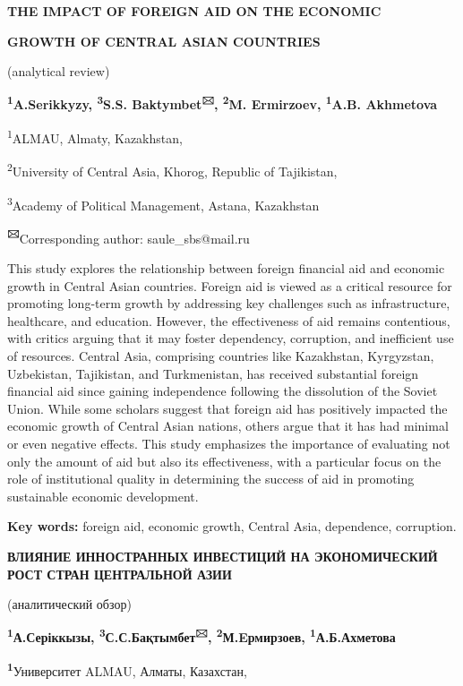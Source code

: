 {\bfseries THE IMPACT OF FOREIGN AID ON THE ECONOMIC}

{\bfseries GROWTH OF CENTRAL ASIAN COUNTRIES}

(analytical review)

{\bfseries \textsuperscript{1}A.Serikkyzy, \textsuperscript{3}S.S.
Baktymbet\textsuperscript{🖂}, \textsuperscript{2}M. Ermirzoev,
\textsuperscript{1}A.B. Akhmetova}

\textsuperscript{1}ALMAU, Almaty, Kazakhstan,

\textsuperscript{2}University of Central Asia, Khorog, Republic of
Tajikistan,

\textsuperscript{3}Academy of Political Management, Astana, Kazakhstan

{\bfseries \textsuperscript{🖂}}Corresponding author: saule\_sbs@mail.ru

This study explores the relationship between foreign financial aid and
economic growth in Central Asian countries. Foreign aid is viewed as a
critical resource for promoting long-term growth by addressing key
challenges such as infrastructure, healthcare, and education. However,
the effectiveness of aid remains contentious, with critics arguing that
it may foster dependency, corruption, and inefficient use of resources.
Central Asia, comprising countries like Kazakhstan, Kyrgyzstan,
Uzbekistan, Tajikistan, and Turkmenistan, has received substantial
foreign financial aid since gaining independence following the
dissolution of the Soviet Union. While some scholars suggest that
foreign aid has positively impacted the economic growth of Central Asian
nations, others argue that it has had minimal or even negative effects.
This study emphasizes the importance of evaluating not only the amount
of aid but also its effectiveness, with a particular focus on the role
of institutional quality in determining the success of aid in promoting
sustainable economic development.

{\bfseries Key words:} foreign aid, economic growth, Central Asia,
dependence, corruption.

{\bfseries ВЛИЯНИЕ ИННОСТРАННЫХ ИНВЕСТИЦИЙ НА ЭКОНОМИЧЕСКИЙ РОСТ СТРАН
ЦЕНТРАЛЬНОЙ АЗИИ}

(аналитический обзор)

{\bfseries \textsuperscript{1}А.Серіккызы,
\textsuperscript{3}С.С.Бақтымбет\textsuperscript{🖂},
\textsuperscript{2}М.Eрмирзоев, \textsuperscript{1}А.Б.Ахметова}

{\bfseries \textsuperscript{1}}Университет ALMAU, Алматы, Казахстан,

